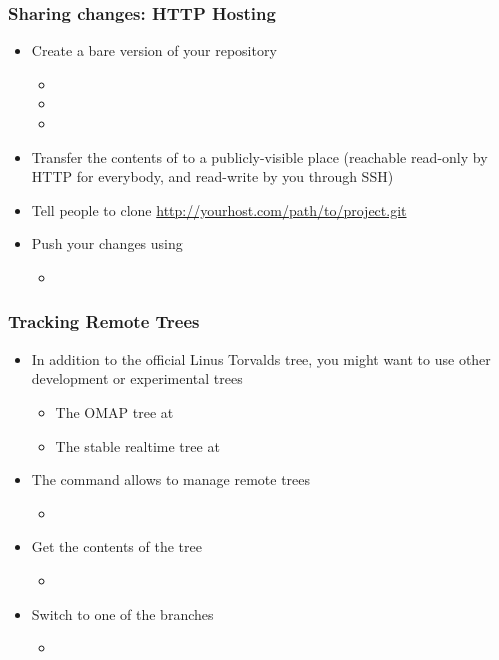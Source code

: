\begin{frame}
  \frametitle{Sharing changes: HTTP Hosting}
  \begin{itemize}
  \item Create a bare version of your repository
    \begin{itemize}
    \item {}
    \item {}
    \item {}
    \end{itemize}
  \item Transfer the contents of  to a
    publicly-visible place (reachable read-only by HTTP for everybody,
    and read-write by you through SSH)
  \item Tell people to clone
    \url{http://yourhost.com/path/to/project.git}
  \item Push your changes using
    \begin{itemize}
    \item
    \end{itemize}
  \end{itemize}
\end{frame}

\begin{frame}
  \frametitle{Tracking Remote Trees}
  \begin{itemize}
  \item In addition to the official Linus Torvalds tree, you might
    want to use other development or experimental trees
    \begin{itemize}
    \item The OMAP tree at
    \item The stable realtime tree at
    \end{itemize}
  \item The  command allows to manage remote trees
    \begin{itemize}
    \item
    \end{itemize}
  \item Get the contents of the tree
    \begin{itemize}
    \item {}
    \end{itemize}
  \item Switch to one of the branches
    \begin{itemize}
    \item {}
    \end{itemize}
  \end{itemize}
\end{frame}

